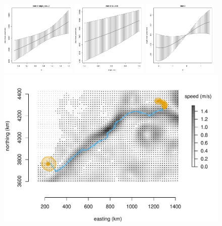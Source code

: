 \documentclass[12pt]{article}\usepackage[]{graphicx}\usepackage[]{color}
\begin{document}
\begin{figure}[htbp]
  \centering
  \includegraphics[width=0.32\textwidth]{plot_turtleResults001.pdf}
  \includegraphics[width=0.32\textwidth]{plot_turtleResults002.pdf}
  \includegraphics[width=0.32\textwidth]{plot_turtleResults004.pdf}
    \includegraphics[width=\textwidth]{plot_turtleResults2.pdf}

\end{figure}
\end{document}
